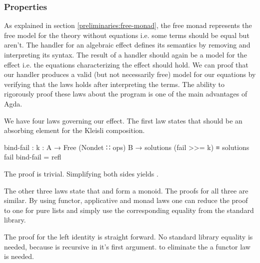 \subsubsection{Properties}
\label{first-order:nondet:properties}

As explained in section \ref{preliminaries:free-monad}, the free monad
represents the free model for the theory without equations i.e. some terms
should be equal but aren't.
The handler for an algebraic effect defines its semantics by removing and
interpreting its syntax.
The result of a handler should again be a model for the effect i.e. the
equations characterizing the effect should hold.
We can proof that our handler produces a valid (but not necessarily free) model
for our equations by verifying that the laws holds after interpreting the terms.
The ability to rigorously proof these laws about the program is one of the main
advantages of Agda.

We have four laws governing our  effect.
The first law states that \AgdaSpace{}
should be an absorbing element for the Kleisli composition.

\begin{code}[number=fail-annihilating]
bind-fail : {k : A → Free (Nondet ∷ ops) B} → 
  solutions (fail >>= k) ≡ solutions fail
bind-fail = refl
\end{code}
The proof is trivial.
Simplifying both sides yields .

The other three laws state that  and  form a
monoid.
The proofs for all three are similar.
By using functor, applicative and monad laws one can reduce the proof to one for
pure lists and simply use the corresponding equality from the standard library.

The proof for the left identity is straight forward.
No standard library equality is needed, because \AgdaFunction{++} is recursive
in it's first argument.
to eliminate the \AgdaFunction{<\$>} a functor law is needed.

